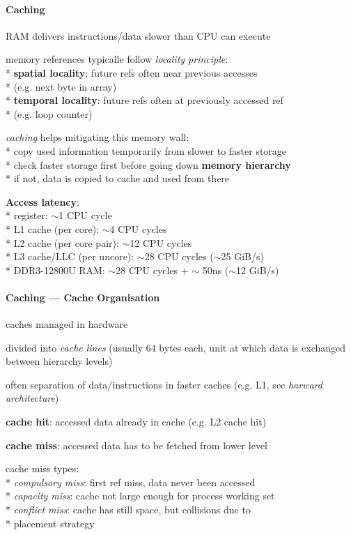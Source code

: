 \paragraph{Caching}
\begin{items}
	\item RAM delivers instructions/data slower than CPU can execute
	\item memory references typicalle follow \emph{locality principle}: \\*
		\textbf{spatial locality}: future refs often near previous accesses \\*
			\phantom{x} (e.g. next byte in array) \\*
		\textbf{temporal locality}: future refs often at previously accessed ref \\*
			\phantom{x} (e.g. loop counter)
	\item \emph{caching} helps mitigating this memory wall: \\*
		copy used information temporarily from slower to faster storage \\*
		check faster storage first before going down \textbf{memory hierarchy} \\*
		if not, data is copied to cache and used from there
	\item \textbf{Access latency}: \\*
		register: \( \sim \)1 CPU cycle \\*
		L1 cache (per core): \( \sim \)4 CPU cycles \\*
		L2 cache (per core pair): \( \sim \)12 CPU cycles \\*
		L3 cache/LLC (per uncore): \( \sim \)28 CPU cycles (\( \sim \)25 GiB/s) \\*
		DDR3-12800U RAM: \( \sim \)28 CPU cycles + \( \sim \) 50ns (\( \sim \)12 GiB/s)
\end{items}

\paragraph{Caching --- Cache Organisation}
\begin{items}
	\item caches managed in hardware
	\item divided into \emph{cache lines} (usually 64 bytes each, unit at which data is exchanged between hierarchy levels)
	\item often separation of data/instructions in faster caches (e.g. L1, see \emph{harward architecture})
	\item \textbf{cache hit}: accessed data already in cache (e.g. L2 cache hit)
	\item \textbf{cache miss}: accessed data has to be fetched from lower level
	\item cache miss types: \\*
		\emph{compulsory miss}: first ref miss, data never been accessed \\*
		\emph{capacity miss}: cache not large enough for process working set \\*
		\emph{conflict miss}: cache has still space, but collisions due to \\* \phantom{x} placement strategy
\end{items}

